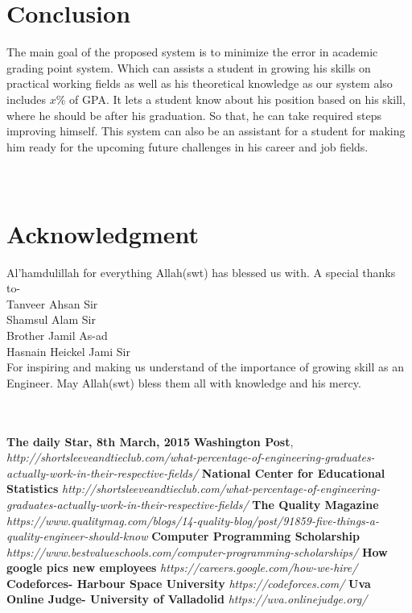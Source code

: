 \documentclass[conference]{IEEEtran}
\begin{document}
\section{Conclusion}
The main goal of the proposed system is to minimize the error in academic grading point system. Which can assists a student in growing his skills on practical working fields as well as his theoretical knowledge as our system also includes $x\%$ of GPA. It lets a student know about his position based on his skill, where he should be after his graduation. So that, he can take required steps improving himself. This system can also be an assistant for a student for making him ready for the upcoming future challenges in his career and job fields.\\\\\\




\section*{Acknowledgment}
Al'hamdulillah for everything Allah(swt) has blessed us with. A special thanks to-\\
Tanveer Ahsan Sir\\
Shamsul Alam Sir\\
Brother Jamil As-ad\\
Hasnain Heickel Jami Sir\\


For inspiring and making us understand of the importance of growing skill as an Engineer. May Allah(swt) bless them all with knowledge and his mercy.  
\\\\\\


\begin{thebibliography}{1}

\textbf{The daily Star, 8th March, 2015}
\textbf{Washington Post}, \textit{http://shortsleeveandtieclub.com/what-percentage-of-engineering-graduates-actually-work-in-their-respective-fields/}
\textbf{National Center for Educational Statistics}
\textit{http://shortsleeveandtieclub.com/what-percentage-of-engineering-graduates-actually-work-in-their-respective-fields/}
\textbf{The Quality Magazine}
\textit{https://www.qualitymag.com/blogs/14-quality-blog/post/91859-five-things-a-quality-engineer-should-know}
\textbf{Computer Programming Scholarship}
\textit{https://www.bestvalueschools.com/computer-programming-scholarships/}
\textbf{How google pics new employees}
\textit{https://careers.google.com/how-we-hire/}
\textbf{Codeforces- Harbour Space University}
\textit{https://codeforces.com/}
\textbf{Uva Online Judge- University of Valladolid}
\textit{https://uva.onlinejudge.org/}\\



\end{thebibliography}
\end{document}
